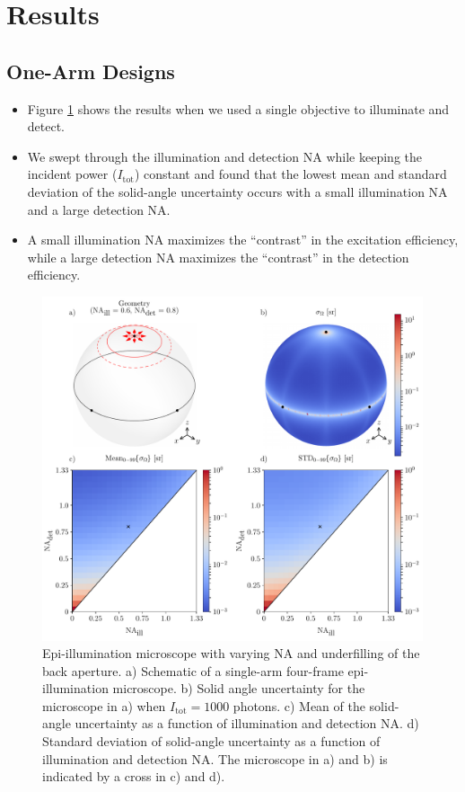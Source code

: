 \documentclass[10pt]{article}
\begin{document}
\section{Results}
\subsection{One-Arm Designs}\label{one-arm}
\begin{itemize}
\item Figure \ref{fig:single-arm} shows the results when we used a single
  objective to illuminate and detect.
\item We swept through the illumination and detection NA while keeping the
  incident power ($I_{\text{tot}}$) constant and found that the lowest mean and
  standard deviation of the solid-angle uncertainty occurs with a small
  illumination NA and a large detection NA.
\item A small illumination NA maximizes the ``contrast'' in the excitation
  efficiency, while a large detection NA maximizes the ``contrast'' in the
  detection efficiency. 
\end{itemize}

\begin{figure}[htbp]
\centering\includegraphics[width=\textwidth]{single-arm}
\caption{Epi-illumination microscope with varying NA and underfilling of the
  back aperture. a) Schematic of a single-arm four-frame epi-illumination
  microscope. b) Solid angle uncertainty for the microscope in a) when
  $I_{\text{tot}} = 1000$ photons. c) Mean of the solid-angle uncertainty as a
  function of illumination and detection NA. d) Standard deviation of
  solid-angle uncertainty as a function of illumination and detection NA. The
  microscope in a) and b) is indicated by a cross in c) and d).}
\label{fig:single-arm}
\end{figure}
\end{document}
